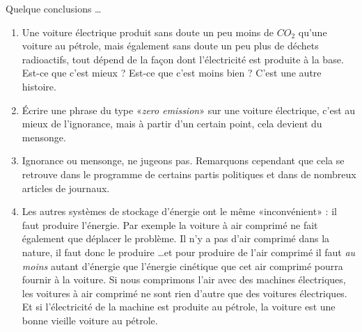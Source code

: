 Quelque conclusions \ldots
\begin{enumerate}

	\item
		Une voiture électrique produit sans doute un peu moins de $CO_2$ qu'une voiture au pétrole, mais également sans doute un peu plus de déchets radioactifs, tout dépend de la façon dont l'électricité est produite à la base. Est-ce que c'est mieux ? Est-ce que c'est moins bien ? C'est une autre histoire.

	\item
		Écrire une phrase du type «\emph{zero emission}» sur une voiture électrique, c'est au mieux de l'ignorance, mais à partir d'un certain point, cela devient du mensonge.
	
	\item
		Ignorance ou mensonge, ne jugeons pas. Remarquons cependant que cela se retrouve dans le programme de certains partis politiques et dans de nombreux articles de journaux.
	\item
		Les autres systèmes de stockage d'énergie ont le même «inconvénient» : il faut produire l'énergie. Par exemple la voiture à air comprimé ne fait également que déplacer le problème. Il n'y a pas d'air comprimé dans la nature, il faut donc le produire \ldots et pour produire de l'air comprimé il faut \emph{au moins} autant d'énergie que l'énergie cinétique que cet air comprimé pourra fournir à la voiture. Si nous comprimons l'air avec des machines électriques, les voitures à air comprimé ne sont rien d'autre que des voitures électriques. Et si l'électricité de la machine est produite au pétrole, la voiture est une bonne vieille voiture au pétrole.

\end{enumerate}


